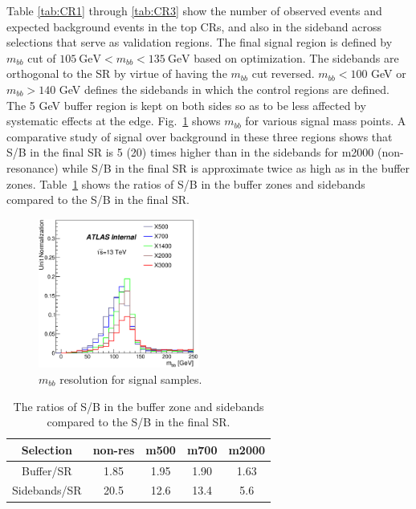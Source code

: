 Table \ref{tab:CR1} through \ref{tab:CR3} show the number of observed
events and expected background events in the top CRs, and also in the sideband across selections that serve as validation regions. The final signal region is defined by $m_{bb}$ cut of $105~\textrm{GeV} < m_{bb} < 135~\textrm{GeV}$ based on optimization. The sidebands are orthogonal to the SR by virtue of having the $m_{bb}$ cut reversed. $m_{bb} < 100$ GeV or $m_{bb} > 140$ GeV defines the sidebands in which the control regions are defined.  The 5 GeV buffer region is kept on both sides so as to be less affected by systematic effects at the edge. Fig.~\ref{fig:mbb_signal} shows $m_{bb}$ for various signal mass points. A comparative study of signal over background in these three regions shows that S/B in the final SR is 5 (20) times higher than in the sidebands for m2000 (non-resonance) while S/B in the final SR is approximate twice as high as in the buffer zones.  Table~\ref{tab:sigOverBkg} shows the ratios of S/B in the buffer zones and sidebands compared to the S/B in the final SR. 

\begin{figure}[!h]
\begin{center}
\includegraphics*[width=0.47\textwidth] {figures/bbMass_X500_X700_X1400_X2000_X3000.eps}
\caption[$m_{bb}$ resolution for signal and sum of backgrounds.]{$m_{bb}$ resolution for signal samples.}
\label{fig:mbb_signal}
\end{center}
\end{figure}

\begin{table}
\begin{center}
\begin{tabular}{c|c|c|c|c|}
Selection & non-res & m500 & m700 & m2000\\
\hline
Buffer/SR              	& 1.85 & 1.95  & 1.90 & 1.63\\
\hline
 Sidebands/SR	       & 20.5 & 12.6 & 13.4 & 5.6\\
\hline 
\end{tabular}
\caption[S/B ratios]{The ratios of S/B in the buffer zone and sidebands compared to the S/B in the final SR. } 
\label{tab:sigOverBkg}
\end{center}
\end{table}

